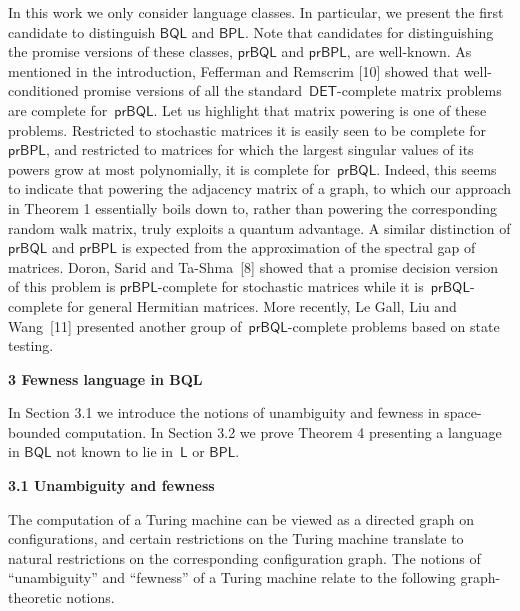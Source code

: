 In this work we only consider language classes. In particular, we present the first candidate to distinguish $\mathsf{BQL}$ and $\mathsf{BPL}$. Note that candidates for distinguishing the promise versions of these classes, $\mathsf{prBQL}$ and $\mathsf{prBPL}$, are well-known.
As mentioned in the introduction, Fefferman and Remscrim [10] showed that well-conditioned promise versions of all the standard $\mathsf{DET}$-complete matrix problems are complete for $\mathsf{prBQL}$.
Let us highlight that matrix powering is one of these problems. Restricted to stochastic matrices it is easily seen to be complete for $\mathsf{prBPL}$, and restricted to matrices for which the largest singular values of its powers grow at most polynomially, it is complete for $\mathsf{prBQL}$.
Indeed, this seems to indicate that powering the adjacency matrix of a graph, to which our approach in Theorem 1 essentially boils down to, rather than powering the corresponding random walk matrix, truly exploits a quantum advantage.
A similar distinction of $\mathsf{prBQL}$ and $\mathsf{prBPL}$ is expected from the approximation of the spectral gap of matrices. Doron, Sarid and Ta-Shma [8] showed that a promise decision version of this problem is $\mathsf{prBPL}$-complete for stochastic matrices while it is $\mathsf{prBQL}$-complete for general Hermitian matrices.
More recently, Le Gall, Liu and Wang [11] presented another group of $\mathsf{prBQL}$-complete problems based on state testing.\par






\par\medskip\noindent\textbf{
3 Fewness language in BQL
}\par




In Section 3.1 we introduce the notions of unambiguity and fewness in space-bounded computation.
In Section 3.2 we prove Theorem 4 presenting a language in $\mathsf{BQL}$ not known to lie in $\mathsf{L}$ or $\mathsf{BPL}$.\par




\par\medskip\noindent\textbf{
3.1 Unambiguity and fewness}\par




The computation of a Turing machine can be viewed as a directed graph on configurations, and certain restrictions on the Turing machine translate to natural restrictions on the corresponding configuration graph.
The notions of “unambiguity” and “fewness” of a Turing machine relate to the following graph-theoretic notions.\par



